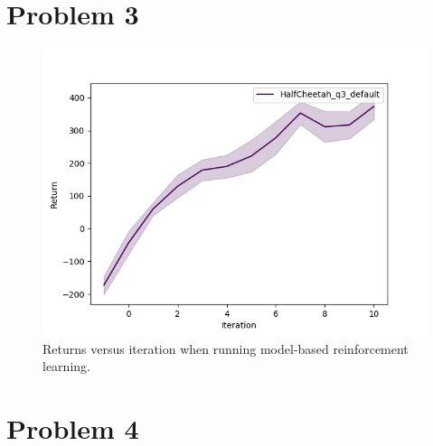 \documentclass[12pt]{article}
\begin{document}
\newpage
\section{Problem 3}
\begin{figure}[!h]
\centering
\includegraphics[width=5in]{Figure_2.jpg}
\caption{Returns versus iteration when running model-based reinforcement learning.}
\end{figure}

\newpage
\section{Problem 4}
\end{document}
